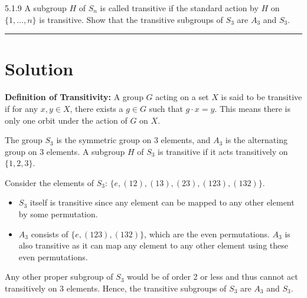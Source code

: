 \documentclass[12pt]{amsart}
\theoremstyle{definition}
\numberwithin{equation}{section}
\begin{document}
\begin{exercise}{5.1.9} A subgroup \(H\) of \(S_n\) is called transitive if the standard action by \(H\) on \(\{1,\dots, n\}\) is transitive. Show that the transitive subgroups of \(S_3\) are \(A_3\) and \(S_3\).

    \noindent\rule{\linewidth}{1pt}

    \section*{Solution}
    
    \noindent \textbf{Definition of Transitivity:} A group \( G \) acting on a set \( X \) is said to be transitive if for any \( x, y \in X \), there exists a \( g \in G \) such that \( g \cdot x = y \). This means there is only one orbit under the action of \( G \) on \( X \).
    
    The group \(S_3\) is the symmetric group on 3 elements, and \(A_3\) is the alternating group on 3 elements. A subgroup \(H\) of \(S_3\) is transitive if it acts transitively on \(\{1, 2, 3\}\).

    Consider the elements of \(S_3\): \(\{e, (12), (13), (23), (123), (132)\}\).

    \begin{itemize}
        \item \(S_3\) itself is transitive since any element can be mapped to any other element by some permutation.
        \item \(A_3\) consists of \(\{e, (123), (132)\}\), which are the even permutations. \(A_3\) is also transitive as it can map any element to any other element using these even permutations.
    \end{itemize}

    Any other proper subgroup of \(S_3\) would be of order 2 or less and thus cannot act transitively on 3 elements. Hence, the transitive subgroups of \(S_3\) are \(A_3\) and \(S_3\).

\end{exercise}
\newpage
\end{document}
